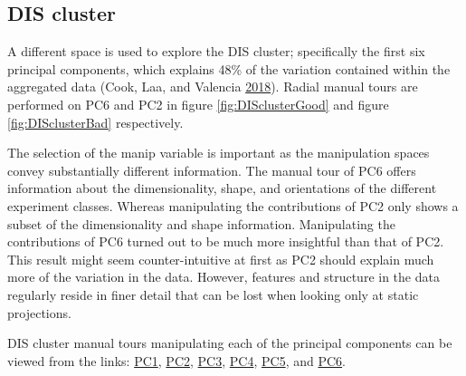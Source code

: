 \hypertarget{dis-cluster}{%
\subsection{DIS cluster}\label{dis-cluster}}

A different space is used to explore the DIS cluster; specifically the
first six principal components, which explains 48\% of the variation
contained within the aggregated data (Cook, Laa, and Valencia
\protect\hyperlink{ref-cook_dynamical_2018}{2018}). Radial manual tours
are performed on PC6 and PC2 in figure \ref{fig:DISclusterGood} and
figure \ref{fig:DISclusterBad} respectively.

The selection of the manip variable is important as the manipulation
spaces convey substantially different information. The manual tour of
PC6 offers information about the dimensionality, shape, and orientations
of the different experiment classes. Whereas manipulating the
contributions of PC2 only shows a subset of the dimensionality and shape
information. Manipulating the contributions of PC6 turned out to be much
more insightful than that of PC2. This result might seem
counter-intuitive at first as PC2 should explain much more of the
variation in the data. However, features and structure in the data
regularly reside in finer detail that can be lost when looking only at
static projections.

DIS cluster manual tours manipulating each of the principal components
can be viewed from the links:
\href{https://nspyrison.netlify.com/thesis/discluster_manualtour_pc1/}{PC1},
\href{https://nspyrison.netlify.com/thesis/discluster_manualtour_pc2/}{PC2},
\href{https://nspyrison.netlify.com/thesis/discluster_manualtour_pc3/}{PC3},
\href{https://nspyrison.netlify.com/thesis/discluster_manualtour_pc4/}{PC4},
\href{https://nspyrison.netlify.com/thesis/discluster_manualtour_pc5/}{PC5},
and
\href{https://nspyrison.netlify.com/thesis/discluster_manualtour_pc6/}{PC6}.

